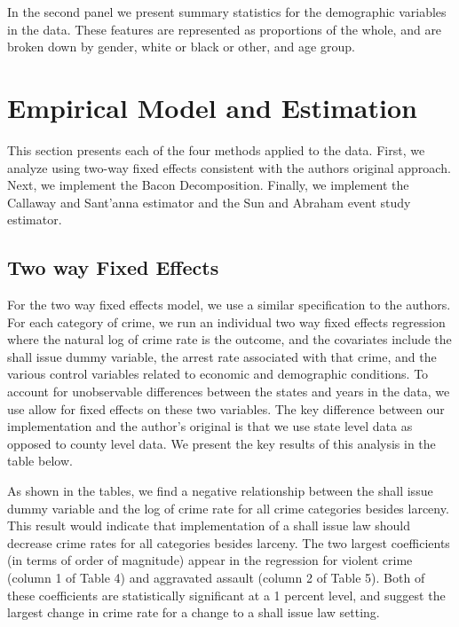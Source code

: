 \documentclass{article}
\begin{document}


In the second panel we present summary statistics for the demographic variables in the data. These features are represented as proportions of the whole, and are broken down by gender, white or black or other, and age group. 

\section{Empirical Model and Estimation}

This section presents each of the four methods applied to the data. First, we analyze using two-way fixed effects consistent with the authors original approach. Next, we implement the Bacon Decomposition. Finally, we implement the Callaway and Sant'anna estimator  and the Sun and Abraham event study estimator.

\subsection{Two way Fixed Effects}

For the two way fixed effects model, we use a similar specification to the authors. For each category of crime, we run an individual two way fixed effects regression where the natural log of crime rate is the outcome, and the covariates include the shall issue dummy variable, the arrest rate associated with that crime, and the various control variables related to economic and demographic conditions. To account for unobservable differences between the states and years in the data, we use allow for fixed effects on these two variables. The key difference between our implementation and the author's original is that we use state level data as opposed to county level data. We present the key results of this analysis in the table below.



As shown in the tables, we find a negative relationship between the shall issue dummy variable and the log of crime rate for all crime categories besides larceny. This result would indicate that implementation of a shall issue law should decrease crime rates for all categories besides larceny. The two largest coefficients (in terms of order of magnitude) appear in the regression for violent crime (column 1 of Table 4) and aggravated assault (column 2 of Table 5). Both of these coefficients are statistically significant at a 1 percent level, and suggest the largest change in crime rate for a change to a shall issue law setting.
\end{document}
